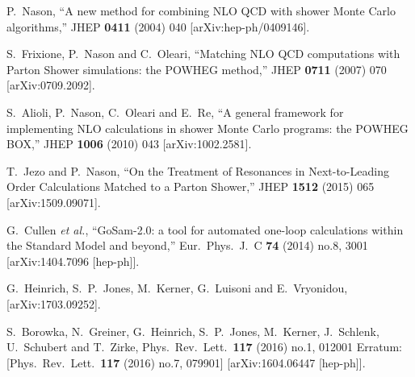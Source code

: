 \documentclass[paper]{JHEP3}
\begin{document}
\begin{thebibliography}{10}

  P.~Nason,
  ``A new method for combining NLO QCD with shower Monte Carlo algorithms,''
  JHEP {\bf 0411} (2004) 040
  [arXiv:hep-ph/0409146].

  S.~Frixione, P.~Nason and C.~Oleari,
  ``Matching NLO QCD computations with Parton Shower simulations: the POWHEG method,''
  JHEP {\bf 0711} (2007) 070
  [arXiv:0709.2092].

  S.~Alioli, P.~Nason, C.~Oleari and E.~Re,
  ``A general framework for implementing NLO calculations in shower Monte Carlo programs: the POWHEG BOX,''
  JHEP {\bf 1006} (2010) 043
  [arXiv:1002.2581].

  T.~Jezo and P.~Nason,
  ``On the Treatment of Resonances in Next-to-Leading Order Calculations Matched to a Parton Shower,''
  JHEP {\bf 1512} (2015) 065
  [arXiv:1509.09071].

  

  G.~Cullen {\it et al.},
  ``GoSam-2.0: a tool for automated one-loop calculations within the Standard Model and beyond,''
  Eur.\ Phys.\ J.\ C {\bf 74} (2014) no.8,  3001
  [arXiv:1404.7096 [hep-ph]].

  G.~Heinrich, S.~P.~Jones, M.~Kerner, G.~Luisoni and E.~Vryonidou,
  [arXiv:1703.09252].  

  S.~Borowka, N.~Greiner, G.~Heinrich, S.~P.~Jones, M.~Kerner, J.~Schlenk, U.~Schubert and T.~Zirke,
  Phys.\ Rev.\ Lett.\  {\bf 117} (2016) no.1,  012001
   Erratum: [Phys.\ Rev.\ Lett.\  {\bf 117} (2016) no.7,  079901]
  [arXiv:1604.06447 [hep-ph]].


\end{thebibliography}
\end{document}
